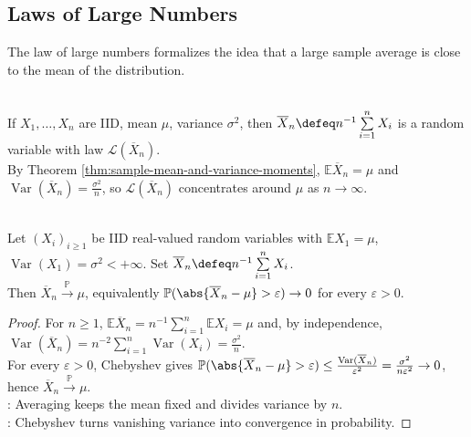 \subsection{Laws of Large Numbers}

The law of large numbers formalizes the idea that a large sample average is
close to the mean of the distribution.

\begin{perspective} \label{per:sampling-distribution-of-sample-mean} \\
If $X_1,\ldots,X_n$ are IID, mean $\mu$, variance $\sigma^2$, then $\overline{X}_n\defeq n^{-1}\sum\limits_{i=1}^{n}X_i$ is a random variable with law $\mathcal{L}(\overline{X}_n)$.\\
By Theorem \ref{thm:sample-mean-and-variance-moments}, $\mathbb{E}\overline{X}_n=\mu$ and $\operatorname{Var}(\overline{X}_n)=\frac{\sigma^2}{n}$, so $\mathcal{L}(\overline{X}_n)$ concentrates around $\mu$ as $n\to\infty$.
\end{perspective}

\begin{theorem} \label{thm:weak-law-large-numbers-finite-variance} \\
Let $(X_i)_{i\geq1}$ be IID real-valued random variables with $\mathbb{E}X_1=\mu$, $\operatorname{Var}(X_1)=\sigma^2<+\infty$. Set $\overline{X}_n\defeq n^{-1}\sum\limits_{i=1}^{n}X_i$.\\
Then $\overline{X}_n\xrightarrow{\mathbb{P}}\mu$, equivalently $\mathbb{P}(\abs{\overline{X}_n-\mu}>\varepsilon)\to0$ for every $\varepsilon>0$.
\begin{proof} For $n\geq1$, $\mathbb{E}\overline{X}_n=n^{-1}\sum\limits_{i=1}^{n}\mathbb{E}X_i=\mu$ and, by independence, $\operatorname{Var}(\overline{X}_n)=n^{-2}\sum\limits_{i=1}^{n}\operatorname{Var}(X_i)=\frac{\sigma^2}{n}$.\\
For every $\varepsilon>0$, Chebyshev gives $\mathbb{P}(\abs{\overline{X}_n-\mu}>\varepsilon)\leq\frac{\operatorname{Var}(\overline{X}_n)}{\varepsilon^2}=\frac{\sigma^2}{n\varepsilon^2}\to0$, hence $\overline{X}_n\xrightarrow{\mathbb{P}}\mu$.\\
: Averaging keeps the mean fixed and divides variance by $n$.\\
: Chebyshev turns vanishing variance into convergence in probability.
\end{proof}
\end{theorem}

